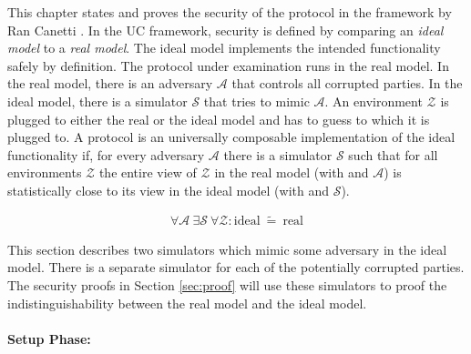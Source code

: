 \label{sec:security}

This chapter states and proves the security of the protocol in the
 framework by Ran Canetti \cite{canetti01}.
In the UC framework, security is defined by comparing an \emph{ideal model} to a
\emph{real model}. The ideal model implements the intended functionality
\JWfuncSym{}{} safely by definition. The protocol under examination runs in the
real model. In the real model, there is an adversary $\mathcal{A}$ that controls
all corrupted parties.  In the ideal model, there is a simulator $\mathcal{S}$
that tries to mimic $\mathcal{A}$. An environment $\mathcal{Z}$ is plugged to
either the real or the ideal model and has to guess to which it is plugged to. A
protocol \JWprotoSym{}{} is an universally composable implementation of the
ideal functionality if, for every adversary $\mathcal{A}$ there is a
simulator $\mathcal{S}$ such that for all environments $\mathcal{Z}$ the entire
view of $\mathcal{Z}$ in the real model (with \JWprotoSym{}{} and $\mathcal{A}$)
is statistically close to its view in the ideal model (with \JWfuncSym{}{} and
$\mathcal{S}$).

\begin{align*}
%
\forall \mathcal{A}\ \exists \mathcal{S}\ \forall \mathcal{Z} :
\text{ideal}\ \widetilde{=}\ \text{real}
%
\end{align*}

%
%


%
%
\label{sec:simulators}

This section describes two simulators which mimic some adversary \JWadv{} in the
ideal model. There is a separate simulator for each of the potentially corrupted
parties. The security proofs in Section \ref{sec:proof} will use these
simulators to proof the indistinguishability between the real model and the
ideal model.

\label{sec:simulator-david}

\paragraph{Setup Phase:}

